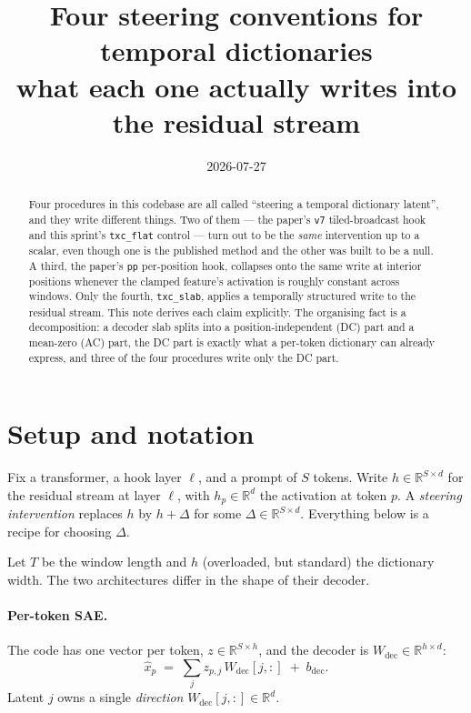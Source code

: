 \documentclass[11pt]{article}
\title{Four steering conventions for temporal dictionaries\\
{\large what each one actually writes into the residual stream}}
\author{}
\date{2026-07-27}
\theoremstyle{definition}
\newcommand{\Rbb}{\mathbb{R}}
\newcommand{\Wdec}{W_{\mathrm{dec}}}
\begin{document}
\maketitle

\begin{abstract}
\noindent
Four procedures in this codebase are all called ``steering a temporal dictionary latent'',
and they write different things. Two of them --- the paper's \texttt{v7} tiled-broadcast hook
and this sprint's \texttt{txc\_flat} control --- turn out to be the \emph{same} intervention up
to a scalar, even though one is the published method and the other was built to be a null. A
third, the paper's \texttt{pp} per-position hook, collapses onto the same write at interior
positions whenever the clamped feature's activation is roughly constant across windows. Only
the fourth, \texttt{txc\_slab}, applies a temporally structured write to the residual stream.
This note derives each claim explicitly. The organising fact is a decomposition: a decoder slab
splits into a position-independent (DC) part and a mean-zero (AC) part, the DC part is exactly
what a per-token dictionary can already express, and three of the four procedures write only
the DC part.
\end{abstract}

\section{Setup and notation}

Fix a transformer, a hook layer $\ell$, and a prompt of $S$ tokens. Write
$h \in \Rbb^{S \times d}$ for the residual stream at layer $\ell$, with $h_p \in \Rbb^d$ the
activation at token $p$. A \emph{steering intervention} replaces $h$ by $h + \Delta$ for some
$\Delta \in \Rbb^{S\times d}$. Everything below is a recipe for choosing $\Delta$.

Let $T$ be the window length and $h$ (overloaded, but standard) the dictionary width. The two
architectures differ in the shape of their decoder.

\paragraph{Per-token SAE.} The code has one vector per token, $z \in \Rbb^{S \times h}$, and the
decoder is $\Wdec \in \Rbb^{h\times d}$:
\begin{equation}
  \hat{x}_p \;=\; \sum_{j} z_{p,j}\,\Wdec[j,:] \;+\; b_{\mathrm{dec}} .
\end{equation}
Latent $j$ owns a single \emph{direction} $\Wdec[j,:] \in \Rbb^d$.
\end{document}
